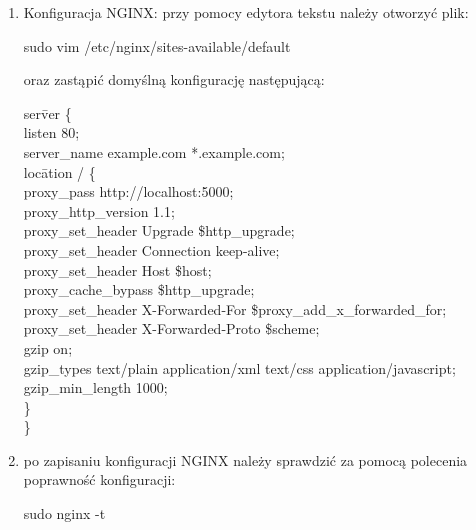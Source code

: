 \documentclass[12pt,a4paper]{article}
\begin{document}
\begin{enumerate}
				\item Konfiguracja NGINX:
					przy pomocy edytora tekstu należy otworzyć plik:	\\
					\begin{tcolorbox}[minipage,colback=white,arc=0pt,outer arc=0pt, fontupper=\footnotesize]
						sudo vim /etc/nginx/sites-available/default
					\end{tcolorbox}	
					oraz zastąpić domyślną konfigurację następującą:	\\
					\begin{tcolorbox}[minipage,colback=white,arc=0pt,outer arc=0pt, fontupper=\footnotesize]
						\begin{tabbing}
							ser\= ver \{\\
								\> listen	80;\\
    							\> server\_name   example.com *.example.com;\\
    							\> loc\= ation / \{\\
        						\>\> proxy\_pass         http://localhost:5000;\\
        						\>\> proxy\_http\_version 1.1;\\
        						\>\> proxy\_set\_header   Upgrade \$http\_upgrade;\\
        						\>\> proxy\_set\_header   Connection keep-alive;\\
        						\>\> proxy\_set\_header   Host \$host;\\
        						\>\> proxy\_cache\_bypass \$http\_upgrade;\\
        						\>\> proxy\_set\_header   X-Forwarded-For \$proxy\_add\_x\_forwarded\_for;\\
        						\>\> proxy\_set\_header   X-Forwarded-Proto \$scheme;\\
        						\>\> gzip on;\\
        						\>\> gzip\_types text/plain application/xml text/css application/javascript;\\
        						\>\> gzip\_min\_length 1000;\\
		    					\> \}\\
							\}
						\end{tabbing}
					\end{tcolorbox}				
			
				\item po zapisaniu konfiguracji NGINX należy sprawdzić za pomocą polecenia poprawność konfiguracji:
					\begin{tcolorbox}[minipage,colback=white,arc=0pt,outer arc=0pt, fontupper=\footnotesize]
						sudo nginx -t
					\end{tcolorbox}
		

\end{enumerate}
\end{document}
